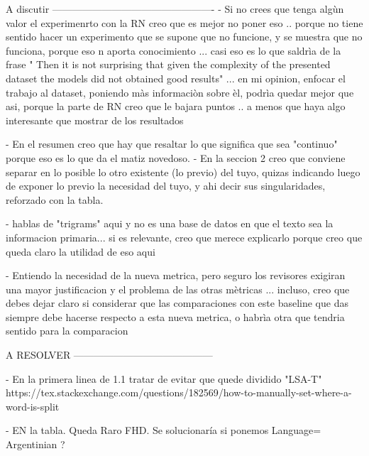 A discutir -------------------------------------------------
- Si no crees que tenga algùn valor el experimenrto con la RN creo que es mejor no poner eso .. porque no tiene sentido hacer un experimento que se supone que no funcione, y se muestra que no funciona, porque eso n aporta conocimiento ... casi eso es lo que saldrìa de la frase " Then it is not surprising that given the complexity
of the presented dataset the models did not obtained good results" ... en mi opinion, enfocar el trabajo al dataset, poniendo màs informaciòn sobre èl, podrìa quedar mejor que asi, porque la parte de RN creo que le bajara puntos .. a menos que haya algo interesante que mostrar de los resultados

- En el resumen creo que hay que resaltar lo que significa que sea "continuo" porque eso es lo que da el matiz novedoso.
- En la seccion 2 creo que conviene separar en lo posible lo otro existente (lo previo) del tuyo, quizas indicando luego de exponer lo previo la necesidad del tuyo, y ahi decir sus singularidades, reforzado con la tabla.

- hablas de "trigrams" aqui y no es una base de datos en que el texto sea la informacion primaria... si es relevante, creo que merece explicarlo porque creo que queda claro la utilidad de eso aqui

- Entiendo la necesidad de la nueva metrica, pero seguro los revisores exigiran una mayor justificacion y el problema de las otras mètricas ... incluso, creo que debes dejar claro si considerar que las comparaciones con este baseline que das siempre debe hacerse respecto a esta nueva metrica, o habrìa otra que tendria sentido para la comparacion


A RESOLVER ------------------------------------------

- En la primera linea de 1.1 tratar de evitar que quede dividido "LSA-T"
https://tex.stackexchange.com/questions/182569/how-to-manually-set-where-a-word-is-split

- EN la tabla. Queda Raro FHD.  Se solucionaría si ponemos Language= Argentinian ?